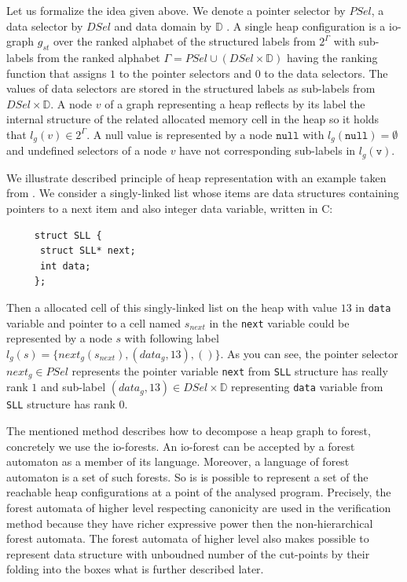 Let us formalize the idea given above.
We denote a pointer selector by $PSel$, a data selector by $DSel$ and data domain by $\mathbb{D}$ \cite{techrep}.
A single heap configuration is a io-graph $g_{st}$ over the ranked alphabet of the structured labels from $2^\Gamma$
with sub-labels from the ranked alphabet $\Gamma = PSel \cup (DSel \times \mathbb{D})$ having the
ranking function that assigns $1$ to the pointer selectors and $0$ to the data selectors.
The values of data selectors are stored in the structured labels as sub-labels from $DSel \times \mathbb{D}$.
A node $v$ of a graph representing a heap reflects by its label the internal structure of
the related allocated memory cell in the heap so it holds that $l_g(v) \in 2^\Gamma$.
A null value is represented by a node $\texttt{null}$ with $l_g(\texttt{null}) = \emptyset$
and undefined selectors of a node $v$ have not corresponding  sub-labels in $l_g(\texttt{v})$.

\bexmp
We illustrate described principle of heap representation with an example taken from \cite{techrep}.
We consider a singly-linked list whose items are data structures containing pointers to
a next item and also integer data variable, written in C:
\begin{center}
\begin{minipage}{0.3\textwidth}
    \begin{verbatim}
     struct SLL {
      struct SLL* next;
      int data;
     };
    \end{verbatim}
\end{minipage}
\end{center}
Then a allocated cell of this singly-linked list on the heap with value $13$ in \texttt{data} variable and pointer to a cell named $s_{next}$
in the \texttt{next} variable could be represented
by a node $s$ with following label $l_g(s) = \{next_g(s_{next}),(data_g,13),()\}$.
As you can see, the pointer selector $next_g \in PSel$ represents the pointer variable \texttt{next} from \texttt{SLL} structure
has really rank $1$ and sub-label $(data_g,13) \in DSel\times \mathbb{D}$ representing \texttt{data} variable from \texttt{SLL} structure
has rank $0$.
\eexmp

The mentioned method describes how to decompose a heap graph to forest, concretely we use the io-forests.
An io-forest can be accepted by a forest automaton as a member of its language.
Moreover, a language of forest automaton is a set of such forests.
So is is possible to represent a set of the reachable heap configurations at a point of the analysed program.
Precisely, the forest automata of higher level respecting canonicity are used in the verification method
because they have richer expressive power then the non-hierarchical forest automata.
The forest automata of higher level also makes possible to represent data structure with unboudned number
of the cut-points by their folding into the boxes what is further described later.

